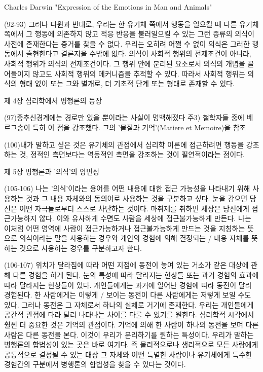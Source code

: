 \documentclass[11pt, a4paper]{article}
\begin{document}
Charles Darwin "Expression of the Emotions in Man and Animals"

(92-93) 그러나 다윈과 반대로, 우리는 한 유기체 쪽에서 행동을 일으킬 때 다른 유기체 쪽에서 그 행동에 의존하지 않고 적응 반응을 불러일으킬 수 있는 그런 종류의 의식이 사전에 존재한다는 증거를 찾을 수 없다. 우리는 오히려 어쩔 수 없이 의식은 그러한 행동에서 출현한다고 결론지을 수밖에 없다. 의식이 사회적 행위의 전제조건이 아니라, 사회적 행위가 의식의 전제조건이다. 그 행위 안에 분리된 요소로서 의식의 개념을 끌어들이지 않고도 사회적 행위의 메커니즘을 추적할 수 있다. 따라서 사회적 행위는 의식의 형태 없이 또는 그와 별개로, 더 기초적 단계 또는 형태로 존재할 수 있다.



제 4장 심리학에서 병행론의 등장

(97)중추신경계에는 경로만 있을 뿐이라는 사실이 명백해졌다
주3) 철학자들 중에 베르그송이 특히 이 점을 강조했다. 그의 '물질과 기억'(Matiere et Memoire)을 참조

(100)내가 말하고 싶은 것은 유기체의 관점에서 심리학 이론에 접근하려면 행동을 강조하는 것, 정적인 측면보다는 역동적인 측면을 강조하는 것이 필연적이라는 점이다.



제 5장 병행론과 '의식'의 양면성

(105-106) 나는 '의식'이라는 용어를 어떤 내용에 대한 접근 가능성을 나타내기 위해 사용하는 것과 그 내용 자체와의 동의어로 사용하는 것을 구분하고 싶다. 눈을 감으면 당신은 어떤 자극들로부터 스스로 차단하는 것이다. 마취제를 취하면 세상은 당신에게 접근가능하지 않다. 이와 유사하게 수면도 사람을 세상에 접근불가능하게 만든다. 나는 이처럼 어떤 영역에 사람이 접근가능하거나 접근불가능하게 만드는 것을 지칭하는 뜻으로 의식이라는 말을 사용하는 경우와 개인의 경험에 의해 결정되는 / 내용 자체를 뜻하는 것으로 사용하는 경우를 구분하고자 한다.

(106-107) 위치가 달라짐에 따라 어떤 지점에 동전이 놓여 있는 거소가 같은 대상에 관해 다른 경험을 하게 된다. 눈의 특성에 따라 달라지는 현상들 또는 과거 경험의 효과에 따라 달라지는 현상들이 있다. 개인들에게는 과거에 일어난 경험에 따라 동전이 달리 경험된다. 한 사람에게는 이렇게 / 보이는 동전이 다른 사람에게는 저렇게 보일 수도 있다. 그러나 동전은 그 자체로서 하나의 실체로 거기에 존재한다. 우리는 개인들에게 공간적 관점에 다라 달리 나타나는 차이를 다룰 수 있기를 원한다. 심리학적 시각에서 훨씬 더 중요한 것은 기억의 관점이다. 기억에 의해 한 사람이 하나의 동전을 보며 다른 사람은 다른 동전을 본다. 이것이 우리가 분리하기를 원하는 특성이다. 우리가 말하는 병행론의 합법성이 있는 곳은 바로 여기다. 즉 물리적으로나 생리적으로 모든 사람에게 공통적으로 결정될 수 있는 대상 그 자체와 어떤 특별한 사람이나 유기체에게 특수한 경험간의 구분에서 병행론의 합법성을 찾을 수 있다는 것이다.
\end{document}

